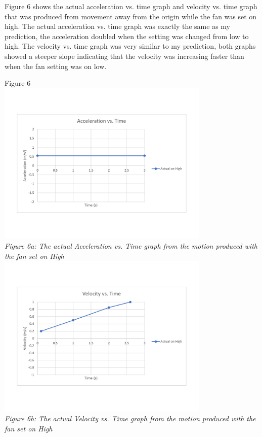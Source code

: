 \documentclass[aps,letterpaper,11pt]{revtex4}
\begin{document}
\newpage 

Figure 6 shows the actual acceleration vs. time graph and velocity vs. time graph that was produced from movement away from the origin while the fan was set on high.
The actual acceleration vs. time graph was exactly the same as my prediction, the acceleration doubled when the setting was changed from low to high. The velocity vs. time graph was very similar to my prediction, both graphs showed a steeper slope indicating that the velocity was increasing faster than when the fan setting was on low. 

\begin{center}
Figure 6\\
\vspace{-10mm}
\includegraphics[width=4in]{PartAActualAcc.pdf}\\
\vspace{-10mm}
\textit{Figure 6a: The actual Acceleration vs. Time graph from the motion produced with the fan set on High}\\
\includegraphics[width=4in]{PartAActualVel.pdf}\\
\vspace{-10mm}
\textit{Figure 6b: The actual Velocity vs. Time graph from the motion produced with the fan set on High}
\end{center}
\end{document}
